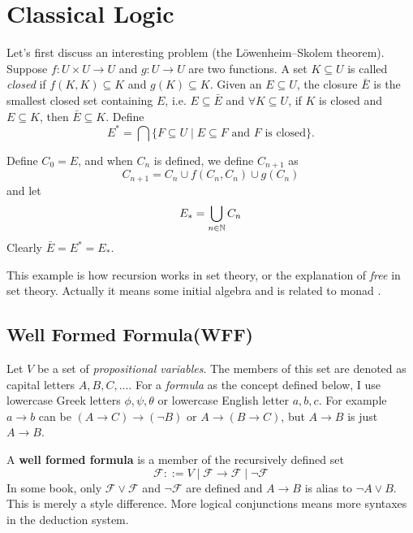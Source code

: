 \chapter{Classical Logic}
\label{classical-logic}
Let's first discuss an interesting problem (the L\"{o}wenheim–Skolem theorem).
Suppose $f:U\times U\to U$ and $g:U\to U$ are two functions. A set
$K\subseteq U$ is called {\it closed} if $f(K,K)\subseteq K$ and 
$g(K)\subseteq K$. Given an $E\subseteq U$, the closure $\bar{E}$ is
the smallest closed set containing $E$, i.e. $E\subseteq \bar{E}$ and
$\forall K\subseteq U$, if $K$ is closed and $E\subseteq K$, then $\bar{E}
\subseteq K$. Define 
$$
    E^\ast = \bigcap\{F\subseteq U\mid E\subseteq F\text{ and $F$ is closed}\}.
$$

Define $C_0=E$, and when $C_n$ is defined, we define $C_{n+1}$ as
$$
    C_{n+1} = C_n\cup f(C_n, C_n)\cup g(C_n)
$$
and let
$$
    E_\ast = \bigcup_{n\in\mathbb{N}}C_n
$$
Clearly $\bar{E}=E^\ast=E_\ast$.

This example is how recursion works in set theory, or the explanation of
{\it free} in set theory. Actually it means some initial algebra 
\cite{homotopy-type-theory} and is related to monad 
\cite{reddy1995monads,jacobs1997tutorial}.

\section{Well Formed Formula(WFF)}

Let $V$ be a set of {\it propositional variables}. The members of this
set are denoted as capital letters $A,B,C,...$. For a {\it formula} as
the concept defined below, I use lowercase Greek letters $\phi,\psi,\theta$
or lowercase English letter $a,b,c$. For example $a\to b$ can be 
$(A\to C)\to(\neg B)$ or $A\to (B\to C)$, but $A\to B$ is just $A\to B$.

A {\bf well formed formula}
is a member of the recursively defined set
\newcommand{\formula}{\mathscr{F}}
$$
    \formula ::= 
        V 
        \mid \formula \to \formula
        \mid \neg \formula
$$
In some book, only $\formula \vee \formula$ and $\neg \formula$ are defined
and $A \to B$ is alias to $\neg A \vee B$. This is merely a style difference.
More logical conjunctions means more syntaxes in the deduction system. 

